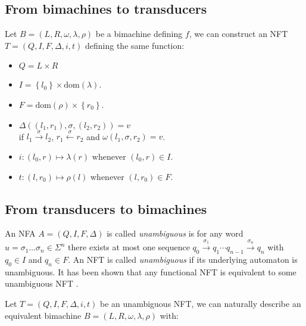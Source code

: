 \documentclass[12pt]{report}
\theoremstyle{definition}
\theoremstyle{remark}
\begin{document}
\subsection{From bimachines to transducers}
\label{totrans}
Let $B=(L,R,\omega,\lambda,\rho)$ be a bimachine defining $f$, we can construct an NFT $T=(Q,I,F,\Delta,i,t)$ defining the same function:

\begin{itemize}
\item $Q=L\times R$
\item $I=\left\{l_0 \right\}\times \mathrm{dom}(\lambda)$.
\item $F=\mathrm{dom}(\rho) \times \left\{r_0\right\}$.
\item $\Delta((l_1,r_1),\sigma,(l_2,r_2))=v$\\ if
$l_1\xrightarrow{\sigma}l_2$, $r_1\xleftarrow{\sigma}r_2$ and $\omega(l_1,\sigma,r_2)=v$.
\item $i:(l_0,r) \mapsto \lambda(r)$ whenever $(l_0,r)\in I$.
\item $t:(l,r_0) \mapsto \rho(l)$ whenever $(l,r_0)\in F$.

\end{itemize}


\subsection{From transducers to bimachines}
\label{tobim}

An NFA $A=\left(Q,I,F,\Delta \right)$ is called \emph{unambiguous} is for any word $u=\sigma_1\ldots \sigma_n\in \Sigma^n$ there exists at most one sequence $q_0\xrightarrow{\sigma_1}q_1\cdots q_{n-1}\xrightarrow{\sigma_n}q_n$ with $q_0\in I$ and $q_n\in F$.
An NFT is called \emph{unambiguous} if its underlying automaton is unambiguous.
It has been shown that any functional NFT is equivalent to some unambiguous NFT \cite{berstelb79}.

Let $T=(Q,I,F,\Delta,i,t)$ be an unambiguous NFT,
we can naturally describe an equivalent bimachine $B=(L,R,\omega,\lambda,\rho)$ with:
\end{document}
